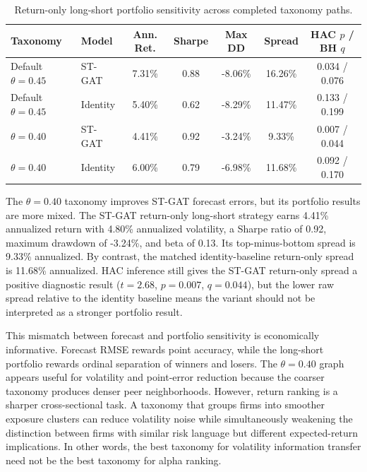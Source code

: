 \documentclass[11pt, a4paper]{article}
\begin{document}
\begin{table}[H]
\centering
\caption{Return-only long-short portfolio sensitivity across completed taxonomy paths.}
\label{tab:portfolio_taxonomy_sensitivity}
\vspace{0.2cm}
\renewcommand{\arraystretch}{1.18}
\small
\begin{tabularx}{\textwidth}{@{}L{2.15cm}L{2.55cm}ccccc@{}}
\toprule
\textbf{Taxonomy} & \textbf{Model} & \textbf{Ann. Ret.} & \textbf{Sharpe} & \textbf{Max DD} & \textbf{Spread} & \textbf{HAC $p$ / BH $q$} \\
\midrule
Default $\theta=0.45$ & ST-GAT & 7.31\% & 0.88 & -8.06\% & 16.26\% & 0.034 / 0.076 \\
Default $\theta=0.45$ & Identity & 5.40\% & 0.62 & -8.29\% & 11.47\% & 0.133 / 0.199 \\
$\theta=0.40$ & ST-GAT & 4.41\% & 0.92 & -3.24\% & 9.33\% & 0.007 / 0.044 \\
$\theta=0.40$ & Identity & 6.00\% & 0.79 & -6.98\% & 11.68\% & 0.092 / 0.170 \\
\bottomrule
\end{tabularx}
\end{table}

The $\theta=0.40$ taxonomy improves ST-GAT forecast errors, but its portfolio results are more mixed. The ST-GAT return-only long-short strategy earns 4.41\% annualized return with 4.80\% annualized volatility, a Sharpe ratio of 0.92, maximum drawdown of -3.24\%, and beta of 0.13. Its top-minus-bottom spread is 9.33\% annualized. By contrast, the matched identity-baseline return-only spread is 11.68\% annualized. HAC inference still gives the ST-GAT return-only spread a positive diagnostic result ($t=2.68$, $p=0.007$, $q=0.044$), but the lower raw spread relative to the identity baseline means the variant should not be interpreted as a stronger portfolio result.

This mismatch between forecast and portfolio sensitivity is economically informative. Forecast RMSE rewards point accuracy, while the long-short portfolio rewards ordinal separation of winners and losers. The $\theta=0.40$ graph appears useful for volatility and point-error reduction because the coarser taxonomy produces denser peer neighborhoods. However, return ranking is a sharper cross-sectional task. A taxonomy that groups firms into smoother exposure clusters can reduce volatility noise while simultaneously weakening the distinction between firms with similar risk language but different expected-return implications. In other words, the best taxonomy for volatility information transfer need not be the best taxonomy for alpha ranking.
\end{document}
